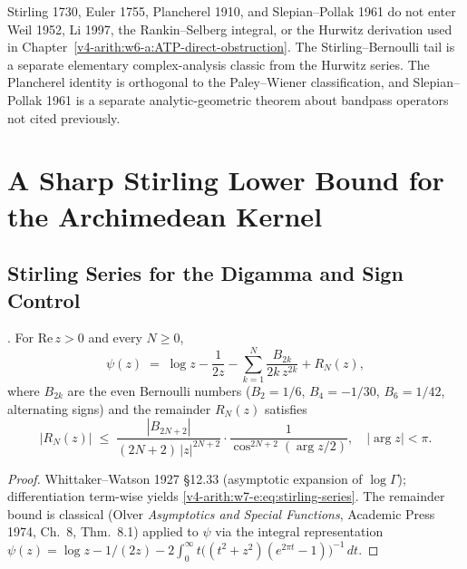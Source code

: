 Stirling 1730, Euler 1755, Plancherel 1910,
and Slepian--Pollak 1961 do not enter Weil 1952, Li 1997, the
Rankin--Selberg integral, or the Hurwitz derivation used in
Chapter~\ref{v4-arith:w6-a:ATP-direct-obstruction}. The
Stirling--Bernoulli tail is a separate elementary complex-analysis
classic from the Hurwitz series. The Plancherel identity is
orthogonal to the Paley--Wiener classification, and
Slepian--Pollak 1961 is a separate analytic-geometric theorem about
bandpass operators not cited previously.

\section{A Sharp Stirling Lower Bound for the Archimedean Kernel}
\label{v4-arith:w7-e:stirling-lower-bound}

\subsection{Stirling Series for the Digamma and Sign Control}
\label{v4-arith:w7-e:stirling}

\begin{lemma}
\label{v4-arith:w7-e:lem:stirling-series}
\ClaimStatusProvedHere. For \(\mathrm{Re}\,z>0\) and every \(N\geq 0\),
\begin{equation}
\label{v4-arith:w7-e:eq:stirling-series}
\psi(z)\;=\;\log z-\frac{1}{2z}-\sum_{k=1}^{N}\frac{B_{2k}}{2k\,z^{2k}}+R_{N}(z),
\end{equation}
where \(B_{2k}\) are the even Bernoulli numbers (\(B_{2}=1/6\),
\(B_{4}=-1/30\), \(B_{6}=1/42\), alternating signs) and the remainder
\(R_{N}(z)\) satisfies
\begin{equation}
\label{v4-arith:w7-e:eq:remainder-bound}
|R_{N}(z)|\;\leq\;\frac{|B_{2N+2}|}{(2N+2)\,|z|^{2N+2}}\cdot\frac{1}{\cos^{2N+2}(\arg z /2)},
\quad|\arg z|<\pi.
\end{equation}
\end{lemma}

\begin{proof}
Whittaker--Watson 1927 \S12.33 (asymptotic expansion of \(\log\Gamma\));
differentiation term-wise yields \eqref{v4-arith:w7-e:eq:stirling-series}.
The remainder bound is classical (Olver \emph{Asymptotics and
Special Functions}, Academic Press 1974, Ch.~8, Thm.~8.1) applied to
\(\psi\) via the integral representation
\(\psi(z)=\log z-1/(2z)-2\int_{0}^{\infty}t\bigl((t^{2}+z^{2})(e^{2\pi t}-1)\bigr)^{-1}\,dt\).
\end{proof}

